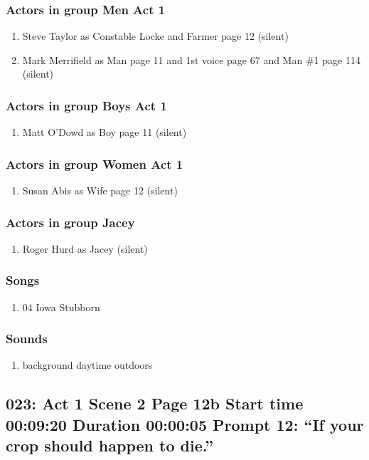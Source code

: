 \subsubsection{Actors in group Men Act 1}
\begin{enumerate}
\item Steve Taylor as Constable Locke and Farmer page 12 (silent)
\item Mark Merrifield as Man page 11 and 1st voice page 67 and Man \#1 page 114 (silent)
\end{enumerate}
\subsubsection{Actors in group Boys Act 1}
\begin{enumerate}
\item Matt O'Dowd as Boy page 11 (silent)
\end{enumerate}
\subsubsection{Actors in group Women Act 1}
\begin{enumerate}
\item Susan Abis as Wife page 12 (silent)
\end{enumerate}
\subsubsection{Actors in group Jacey}
\begin{enumerate}
\item Roger Hurd as Jacey (silent)
\end{enumerate}

\subsubsection{Songs}
\begin{enumerate}
\item 04 Iowa Stubborn
\end{enumerate}\subsubsection{Sounds}
\begin{enumerate}
\item background daytime outdoors
\end{enumerate}
\subsection{023: Act 1 Scene 2 Page 12b Start time 00:09:20 Duration 00:00:05 Prompt 12: ``If your crop should happen to die.''}

